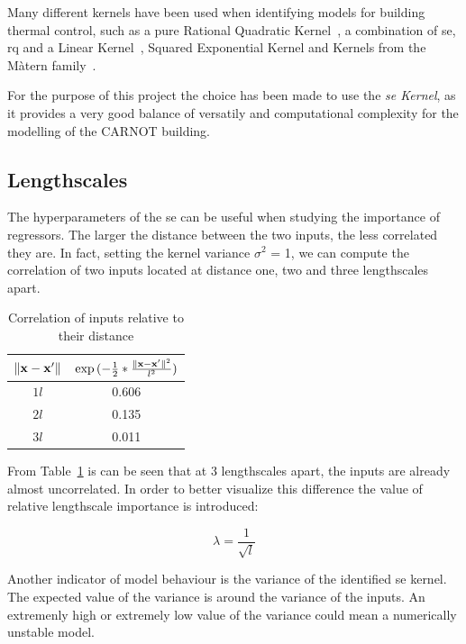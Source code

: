 Many different kernels have been used when identifying models for building
thermal control, such as a pure Rational Quadratic
Kernel~\cite{pleweSupervisoryModelPredictive2020}, a combination of
\acrshort{se}, \acrshort{rq} and a Linear
Kernel~\cite{jainLearningControlUsing2018}, Squared Exponential Kernel and
Kernels from the M\`atern family~\cite{massagrayThermalBuildingModelling2016}.

For the purpose of this project the choice has been made to use the
\textit{\acrlong{se} Kernel}, as it provides a very good balance of versatily
and computational complexity for the modelling of the CARNOT building.

\subsection{Lengthscales}\label{sec:lengthscales}

The hyperparameters of the \acrshort{se} can be useful when studying the
importance of regressors. The larger the distance between the two inputs, the
less correlated they are. In fact, setting the kernel variance $\sigma^2$ = 1,
we can compute the correlation of two inputs located at distance one, two and
three lengthscales apart. 

\begin{table}[ht]
\centering
    \begin{tabular}{||c c ||}
        \hline
        $\lVert\mathbf{x} - \mathbf{x}'\rVert$ &
        $\exp{(-\frac{1}{2}*\frac{\lVert\mathbf{x} - \mathbf{x}'\rVert^2}{l^2})}$ \\
        \hline \hline
        $1l$ & 0.606 \\
        $2l$ & 0.135 \\
        $3l$ & 0.011 \\
        \hline
    \end{tabular}
\caption{Correlation of inputs relative to their distance}
\label{tab:se_correlation}
\end{table}

From Table~\ref{tab:se_correlation} is can be seen that at 3 lengthscales apart,
the inputs are already almost uncorrelated. In order to better visualize this
difference the value of relative lengthscale importance is introduced:

\begin{equation}
    \lambda = \frac{1}{\sqrt{l}}
\end{equation}

Another indicator of model behaviour is the variance of the identified
\acrshort{se} kernel. The expected value of the variance is around the variance
of the inputs. An extremenly high or extremely low value of the variance could
mean a numerically unstable model.

